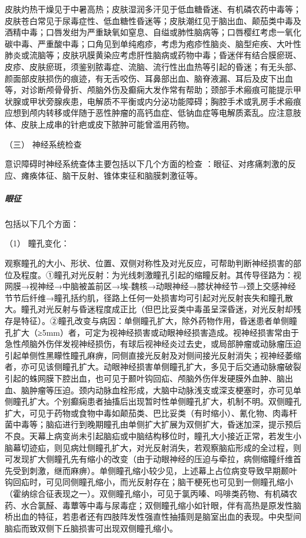 皮肤灼热干燥见于中暑高热；皮肤湿润多汗见于低血糖昏迷、有机磷农药中毒等；皮肤苍白常见于尿毒症性、低血糖性昏迷等；皮肤潮红见于脑出血、颠茄类中毒及酒精中毒；口唇发绀为严重缺氧如窒息、自缢或肺性脑病等；口唇樱红考虑一氧化碳中毒、严重酸中毒；口角见到单纯疱疹，考虑为疱疹性脑炎、脑型疟疾、大叶性肺炎或流脑等；皮肤巩膜黄染应考虑肝性脑病或药物中毒；昏迷伴有结合膜瘀斑、皮疹、皮肤瘀斑，须鉴别脓毒症、流脑、流行性出血热等引起的昏迷；有无头部、颜面部皮肤损伤的痕迹，有无舌咬伤、耳鼻部出血、脑脊液漏、耳后及皮下出血等，对诊断颅骨骨折、颅脑外伤及癫痫大发作常有帮助；颈部手术瘢痕可能提示甲状腺或甲状旁腺疾患，电解质不平衡或内分泌功能障碍；胸腔手术或乳房手术瘢痕应想到颅内转移或伴随于恶性肿瘤的高钙血症、低钠血症等电解质紊乱。应注意肢体、皮肤上成串的针疤或皮下脓肿可能曾滥用药物。

\hypertarget{text00010.htmlux5cux23CHP1-2-2-1-3}{}
（三） 神经系统检查

意识障碍时神经系统查体主要包括以下几个方面的检查
：眼征、对疼痛刺激的反应、瘫痪体征、脑干反射、锥体束征和脑膜刺激征等。

\subparagraph{眼征}

包括以下几个方面：

\hypertarget{text00010.htmlux5cux23CHP1-2-2-1-3-1-1}{}
（1） 瞳孔变化：

观察瞳孔的大小、形状、位置、双侧对称性及对光反应，可帮助判断神经损害的部位及程度。①瞳孔对光反射：为光线刺激瞳孔引起的缩瞳反射。其传导径路为：视网膜→视神经→中脑被盖前区→埃-魏核→动眼神经→膝状神经节→颈上交感神经节节后纤维→瞳孔括约肌，径路上任何一处损害均可引起对光反射丧失和瞳孔散大。瞳孔对光反射与昏迷程度成正比（但巴比妥类中毒虽呈深昏迷，对光反射却残存是特征）。②瞳孔改变与病因：单侧瞳孔扩大，除外药物作用，昏迷患者单侧瞳孔扩大（≥5mm）者，可定为视神经损害或动眼神经损害造成。视神经损害常由于急性颅脑外伤伴发视神经损伤，有球后视神经炎过去史，或局部肿瘤或动脉瘤压迫引起单侧性黑矇性瞳孔麻痹，同侧直接光反射及对侧间接光反射消失；视神经萎缩者，亦可见该侧瞳孔扩大。动眼神经损害单侧瞳孔扩大，多见于后交通动脉瘤破裂引起的蛛网膜下腔出血，也可见于颞叶钩回疝、颅脑外伤伴发硬膜外血肿、脑出血、脑肿瘤等压迫。颈内动脉血栓形成，大脑中动脉浅支或深支梗塞时，亦可见单侧瞳孔扩大。个别癫痫患者抽搐后出现暂时性单侧瞳孔扩大，机制不明。双侧瞳孔扩大，可见于药物或食物中毒如颠茄类、巴比妥类（有时缩小）、氰化物、肉毒杆菌中毒等；脑疝进行到晚期瞳孔由单侧扩大扩展为双侧扩大，昏迷加深，提示预后不良。天幕上病变尚未引起脑疝或中脑结构移位时，瞳孔大小接近正常，若发生小脑幕切迹疝，则见病灶侧瞳孔扩大，对光反射消失，若观察脑疝形成的全过程，则可发现扩大侧瞳孔先有缩小的改变（由于动眼神经的压迫与牵拉，病侧缩瞳纤维首先受到刺激，继而麻痹）。单侧瞳孔缩小较少见，上述幕上占位病变导致早期颞叶钩回疝时，可见同侧瞳孔缩小，而光反射存在；脑干梗死也可见到一侧瞳孔缩小（霍纳综合征表现之一）。双侧瞳孔缩小，可见于氯丙嗪、吗啡类药物、有机磷农药、水合氯醛、毒蕈等中毒与尿毒症；双侧瞳孔缩小如针眼，伴有高热是原发性脑桥出血的特征，若患者还有四肢阵发性强直性抽搐则是脑室出血的表现。中央型间脑疝而致双侧下丘脑损害可出现双侧瞳孔缩小。

